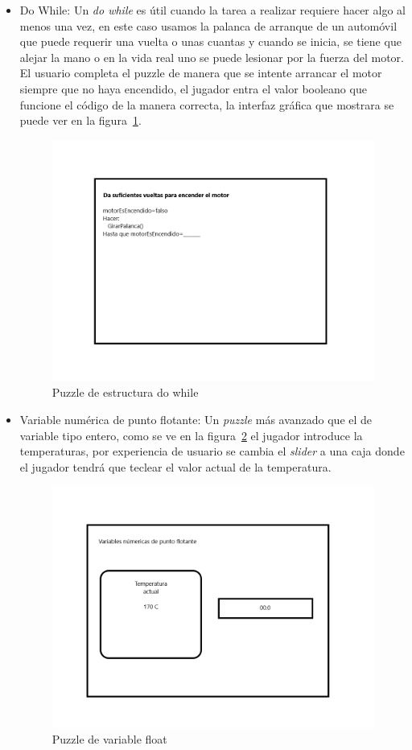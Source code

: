 \begin{itemize}
    \item Do While: Un \textit{do while} es útil cuando la tarea a realizar requiere hacer algo al menos una vez, en este caso usamos la palanca de arranque de un automóvil que puede requerir una vuelta o unas cuantas y cuando se inicia, se tiene que alejar la mano o en la vida real uno se puede lesionar por la fuerza del motor. El usuario completa el puzzle de manera que se intente arrancar el motor siempre que no haya encendido, el jugador entra el valor booleano que funcione el código de la manera correcta, la interfaz gráfica que mostrara se puede ver en la figura~\ref{fig:puzzle_do_while}.
    \begin{figure}[H]
        \centering
        \includegraphics[width=0.5\linewidth]{images/PuzzleDoWhile.png}
        \caption{Puzzle de estructura do while}
        \label{fig:puzzle_do_while}
    \end{figure}
    \item Variable numérica de punto flotante: Un \textit{puzzle} más avanzado que el de variable tipo entero, como se ve en la figura~\ref{fig:puzzle_float} el jugador introduce la temperaturas, por experiencia de usuario se cambia el \textit{slider} a una caja donde el jugador tendrá que teclear el valor actual de la temperatura.
    \begin{figure}[H]
        \centering
        \includegraphics[width=0.5\linewidth]{images/PuzzleFloat.png}
        \caption{Puzzle de variable float}
        \label{fig:puzzle_float}
    \end{figure}

\end{itemize}
